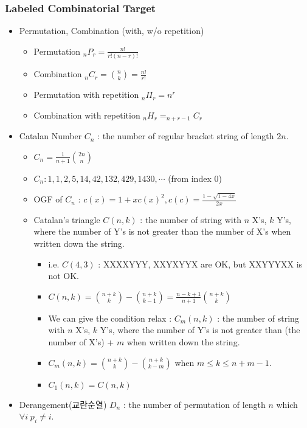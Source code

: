 \documentclass[landscape, 8pt, a4paper, oneside]{extarticle}
\begin{document}
\begin{multicols}{3}
\subsubsection{Labeled Combinatorial Target}
\begin{itemize}
    \item Permutation, Combination (with, w/o repetition)
    \begin{itemize}
        \item Permutation $_nP_r = \frac{n!}{r!(n-r)!}$
        \item Combination $_nC_r = \binom n k = \frac{n!}{r!}$
        \item Permutation with repetition $_n\Pi_r = n^r$
        \item Combination with repetition $_nH_r = _{n+r-1}C_r$
    \end{itemize}
    \item Catalan Number $C_n$ : the number of regular bracket string of length $2n$.
    \begin{itemize}
        \item $C_n = \frac{1}{n+1}\binom {2n}n$
        \item $C_n : 1, 1, 2, 5, 14, 42, 132,429,1430,\cdots$ (from index 0)
        \item OGF of $C_n$ : $c(x) = 1+xc(x)^2, c(c) = \frac{1-\sqrt{1-4x}}{2x}$
        \item Catalan's triangle $C(n, k)$ : the number of string with $n$ X's, $k$ Y's, where the number of Y's is not greater than the number of X's when written down the string.
        \begin{itemize}
            \item i.e. $C(4, 3)$ : XXXXYYY, XXYXYYX are OK, but XXYYYXX is not OK.
            \item $C(n, k) = \binom{n+k}{k} - \binom{n+k}{k-1} = \frac{n-k+1}{n+1}\binom{n+k}{k}$
            \item We can give the condition relax : $C_m(n, k)$ : the number of string with $n$ X's, $k$ Y's, where the number of Y's is not greater than (the number of X's) + $m$ when written down the string.
            \item $C_m(n, k) = \binom{n+k}{k}-\binom{n+k}{k-m}$ when $m\leqslant k \leqslant n+m-1$.
            \item $C_1(n, k) = C(n, k)$
        \end{itemize}
    \end{itemize}
    \item Derangement(교란순열) $D_n$ : the number of permutation of length $n$ which $\forall i\;p_i \neq i$.

\end{itemize}
\end{multicols}
\end{document}

